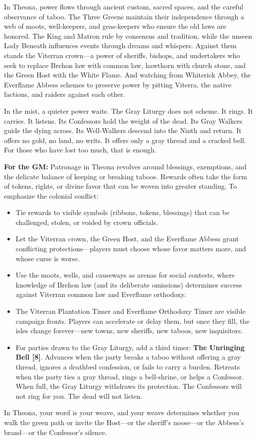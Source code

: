 \begin{tcolorbox}[colback=black!3,colframe=black!40!white,title={Patronage \& Power},breakable]
In Theona, power flows through ancient custom, sacred spaces, and the careful observance of taboo. The Three Greens maintain their independence through a web of moots, well-keepers, and geas-keepers who ensure the old laws are honored. The King and Matron rule by consensus and tradition, while the unseen Lady Beneath influences events through dreams and whispers. Against them stands the Viterran crown---a power of sheriffs, bishops, and undertakers who seek to replace Brehon law with common law, hawthorn with church stone, and the Green Host with the White Flame. And watching from Whiterick Abbey, the Everflame Abbess schemes to preserve power by pitting Viterra, the native factions, and raiders against each other.

In the mist, a quieter power waits. The Gray Liturgy does not scheme. It rings. It carries. It listens. Its Confessors hold the weight of the dead. Its Gray Walkers guide the dying across. Its Well-Walkers descend into the Ninth and return. It offers no gold, no land, no writs. It offers only a gray thread and a cracked bell. For those who have lost too much, that is enough.

\textbf{For the GM:}  
Patronage in Theona revolves around blessings, exemptions, and the delicate balance of keeping or breaking taboos. Rewards often take the form of tokens, rights, or divine favor that can be woven into greater standing. To emphasize the colonial conflict:
\begin{itemize}
\item Tie rewards to visible symbols (ribbons, tokens, blessings) that can be challenged, stolen, or voided by crown officials.
\item Let the Viterran crown, the Green Host, and the Everflame Abbess grant conflicting protections---players must choose whose favor matters more, and whose curse is worse.
\item Use the moots, wells, and causeways as arenas for social contests, where knowledge of Brehon law (and its deliberate omissions) determines success against Viterran common law and Everflame orthodoxy.
\item The Viterran Plantation Timer and Everflame Orthodoxy Timer are visible campaign fronts. Players can accelerate or delay them, but once they fill, the isles change forever---new towns, new sheriffs, new taboos, new inquisitors.
\item For parties drawn to the Gray Liturgy, add a third timer: \textbf{The Unringing Bell [8]}. Advances when the party breaks a taboo without offering a gray thread, ignores a deathbed confession, or fails to carry a burden. Retreats when the party ties a gray thread, rings a bell-shrine, or helps a Confessor. When full, the Gray Liturgy withdraws its protection. The Confessors will not ring for you. The dead will not listen.
\end{itemize}
In Theona, your word is your weave, and your weave determines whether you walk the green path or invite the Host---or the sheriff's noose---or the Abbess's brand---or the Confessor's silence.
\end{tcolorbox}

